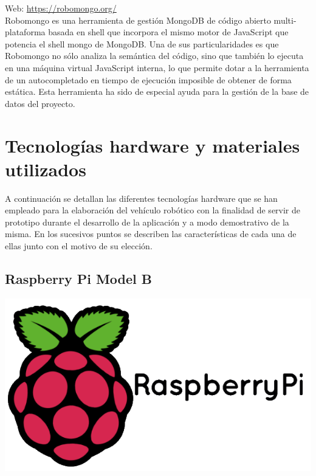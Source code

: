 Web: \url{https://robomongo.org/}\\


Robomongo es una herramienta de gestión MongoDB de código abierto multi-plataforma basada en shell que incorpora el mismo motor de JavaScript que potencia el shell mongo de MongoDB.
Una de sus particularidades es que Robomongo no sólo analiza la semántica del código, sino que también lo ejecuta en una máquina virtual JavaScript interna, lo que permite dotar a la 
herramienta de un autocompletado en tiempo de ejecución imposible de obtener de forma estática. Esta herramienta ha sido de especial ayuda para la gestión de la base de datos del proyecto.\\


\section{Tecnologías hardware y materiales utilizados}
\label{sec:tecnologias-hardware}


A continuación se detallan las diferentes tecnologías hardware que se han
empleado para la elaboración del vehículo robótico con la finalidad de servir de prototipo durante el desarrollo de la aplicación y a modo demostrativo de la misma. En los sucesivos puntos
se describen las características de cada una de ellas junto con el motivo de su elección.


\subsection{Raspberry Pi Model B}
\label{sec:raspberry}



\begin{center}
\includegraphics[scale=0.3]{imagenes/RaspberryPi-logo.png}
\end{center}

